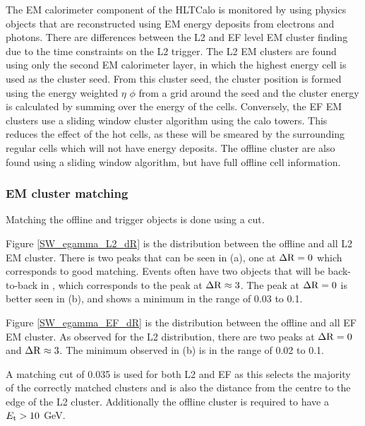 
The EM calorimeter component of the HLTCalo is monitored by using physics objects that are reconstructed using EM energy deposits from electrons and photons. 
There are differences between the L2 and EF level EM cluster finding due to the time constraints on the L2 trigger.  
The L2 EM clusters are found using only the second EM calorimeter layer, in which the highest energy cell is used as the cluster seed.
From this cluster seed, the cluster position is formed using the energy weighted $\eta$ $\phi$ from a grid  around the seed and the cluster energy is calculated by summing over the energy of the cells. 
Conversely, the EF EM clusters use a sliding window cluster algorithm using the calo towers. 
This reduces the effect of the hot cells, as these will be smeared by the surrounding regular cells which will not have energy deposits.
The offline cluster are also found using a sliding window algorithm, but have full offline cell information.
 

\subsubsection{EM cluster matching}

Matching the offline and trigger objects is done using a \dr{} cut.

Figure \ref{SW_egamma_L2_dR} is the \dr{} distribution between the offline and all L2 EM cluster.
There is two peaks that can be seen in (a), one at $\mbox{$\Delta{\rm R}$}{}=0$ which corresponds to good matching.
Events often have two objects that will be back-to-back in \dphi{}, which corresponds to the peak at $\mbox{$\Delta{\rm R}$}{}\approx3$. 
The peak at $\mbox{$\Delta{\rm R}$}{}=0$ is better seen in (b), and shows a minimum in the range \dr{} of 0.03 to 0.1.

Figure \ref{SW_egamma_EF_dR} is the \dr{} distribution between the offline and all EF EM cluster.
As observed for the L2 \dr{} distribution, there are two peaks at $\mbox{$\Delta{\rm R}$}{}=0$ and $\mbox{$\Delta{\rm R}$}{}\approx3$. 
The minimum observed in (b) is in the range \dr{} of 0.02 to 0.1.

A \dr{} matching cut of 0.035 is used for both L2 and EF as this selects the majority of the correctly matched clusters and is also the distance from the centre to the edge of the L2 cluster.
Additionally the offline cluster is required to have a $\mbox{$E_{\rm t}$}{}>10$ GeV.  

